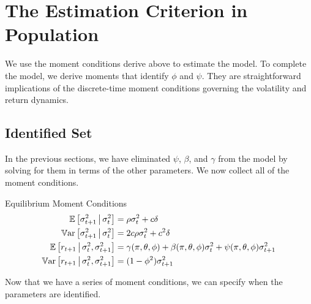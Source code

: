 \documentclass[11pt, letterpaper, twoside]{article}
\begin{document}
\section{The Estimation Criterion in Population}\label{sec:EstimationCriterion}

We use the moment conditions derive above to estimate the model. To complete the model, we derive moments that identify $\phi$ and $\psi$.  They are straightforward implications of the discrete-time moment conditions governing the volatility and return dynamics. 

\subsection{Identified Set}\label{sec:identified_set}

In the previous sections, we have eliminated $\psi$, $\beta$, and $\gamma$ from the model by solving for them in terms of the other parameters.
We now collect all of the moment conditions.

\begin{defn}{Equilibrium Moment Conditions}
    \label{defn:equilibrium_moment_conditions}
    \begin{align}
        \label{eqn:cond_vol_mean}
        \E\left[\sigma^2_{t+1} \mvert \sigma^2_t \right] &= \rho \sigma^2_t + c \delta\\
%    
        \label{eqn:cond_vol_var}
        \Var\left[\sigma^2_{t+1} \mvert \sigma^2_t \right] &= 2 c \rho \sigma^2_t + c^2 \delta \\
%        
        \label{eqn:cond_expected_rtn_moment}
        \E\left[r_{t+1} \mvert \sigma^2_t, \sigma^2_{t+1}\right] &= \gamma(\pi, \theta, \phi) + \beta(\pi, \theta, \phi) \sigma^2_t + \psi(\pi, \theta, \phi) \sigma^2_{t+1} \\
%        
        \label{eqn:cond_rtn_var}
        \Var\left[r_{t+1} \mvert \sigma^2_t, \sigma^2_{t+1}\right] &= (1 - \phi^2) \sigma^2_{t+1} 
    \end{align}
\end{defn}

Now that we have a series of moment conditions, we can specify when the parameters are identified.
\end{document}
